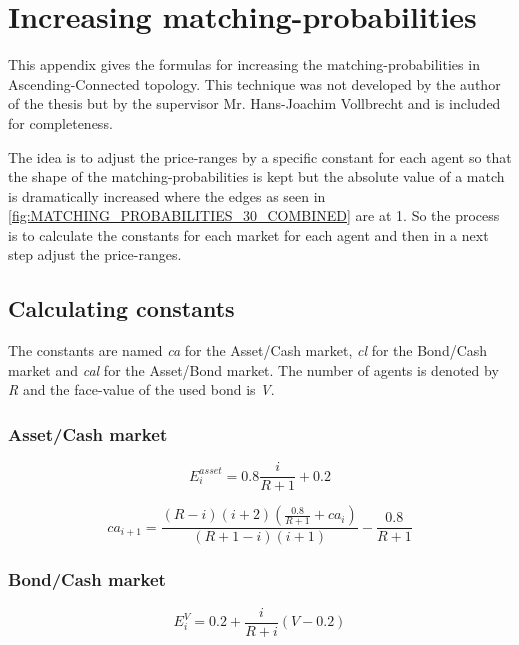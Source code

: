 \documentclass[Bachelorarbeit.tex]{subfiles}
\begin{document}
\chapter{Increasing matching-probabilities}
\label{app:increasingMatchingProbability}

This appendix gives the formulas for increasing the matching-probabilities in Ascending-Connected topology. This technique was not developed by the author of the thesis but by the supervisor Mr. Hans-Joachim Vollbrecht and is included for completeness.

\bigskip

The idea is to adjust the price-ranges by a specific constant for each agent so that the shape of the matching-probabilities is kept but the absolute value of a match is dramatically increased where the edges as seen in \ref{fig:MATCHING_PROBABILITIES_30_COMBINED} are at 1. So the process is to calculate the constants for each market for each agent and then in a next step adjust the price-ranges. 

\section{Calculating constants}
The constants are named \textit{ca} for the Asset/Cash market, \textit{cl} for the Bond/Cash market and \textit{cal} for the Asset/Bond market. The number of agents is denoted by \textit{R} and the face-value of the used bond is \textit{V}.

\subsection{Asset/Cash market}

\begin{equation}
E_{i}^{asset} = 0.8 \frac{i}{R+1} + 0.2
\end{equation}

\begin{equation}
ca_{i+1} = \frac{(R-i)(i+2)(\frac{0.8}{R+1}+ca_i)}{(R+1-i)(i+1)} - \frac{0.8}{R+1}
\end{equation}

\subsection{Bond/Cash market}

\begin{equation}
E_{i}^{V} = 0.2 + \frac{i}{R+i}(V-0.2)
\end{equation}
\end{document}
